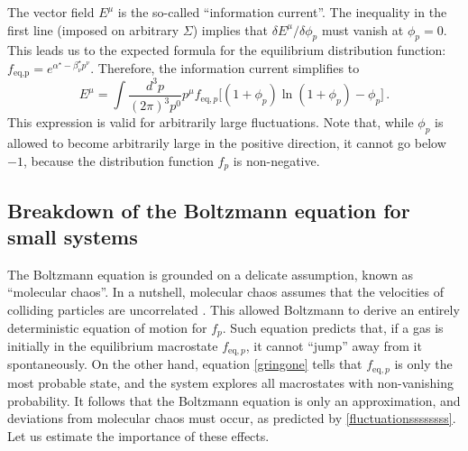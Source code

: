 \documentclass[aps,prd,preprint,nofootinbib,amsmath,amssymb,showpacs,longbibliography,singlecolumn,superscriptaddress,10pt]{revtex4-1}
\theoremstyle{plain}
\theoremstyle{definition}
\begin{document}
The vector field $E^\mu$ is the so-called ``information current''. The inequality in the first line (imposed on arbitrary $\Sigma$) implies that $\delta E^\mu/\delta \phi_p$ must vanish at $\phi_p=0$. This leads us to the expected formula for the equilibrium distribution function: $f_{\text{eq,p}}=e^{\alpha^\star{-}\beta^\star_\nu p^\nu}$. Therefore, the information current simplifies to
\begin{equation}\label{phuiummum}
    E^\mu = \int \dfrac{d^3 p}{(2\pi)^3 p^0} p^\mu f_{\text{eq},p}\bigg[ (1{+}\phi_p)\ln(1{+}\phi_p)-\phi_p\bigg] \, .
\end{equation}
This expression is valid for arbitrarily large fluctuations. Note that, while $\phi_p$ is allowed to become arbitrarily large in the positive direction, it cannot go below $-1$, because the distribution function $f_p$ is non-negative.

\subsection{Breakdown of the Boltzmann equation for small systems}

The Boltzmann equation is grounded on a delicate assumption, known as ``molecular chaos''. In a nutshell, molecular chaos assumes that the velocities of colliding particles are uncorrelated \cite{huang_book}. This allowed Boltzmann to derive an entirely deterministic equation of motion for $f_p$. Such equation predicts that, if a gas is initially in the equilibrium macrostate $f_{\text{eq},p}$, it cannot ``jump'' away from it spontaneously. On the other hand, equation \eqref{gringone} tells that $f_{\text{eq},p}$ is only the most probable state, and the system explores all macrostates with non-vanishing probability. It follows that the Boltzmann equation is only an approximation, and deviations from molecular chaos must occur, as predicted by \eqref{fluctuationssssssss}. Let us estimate the importance of these effects.
\end{document}
